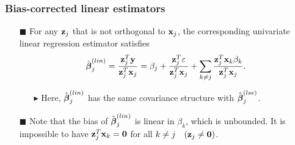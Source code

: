 \begin{frame}
\frametitle{Bias-corrected linear estimators}
\begin{itemize}

\item[$\blacksquare$] For any $\mbox{\bf z}_{j}$ that is not orthogonal to $\mbox{\bf x}_{j}$, the corresponding univariate linear regression estimator satisfies
\begin{equation*}
\hat{\mbox{\boldmath $\beta$}}^{(lin)}_{j}= \frac{\mbox{\bf z}^{T}_{j} \mbox{\bf y}}{\mbox{\bf z}^{T}_{j} \mbox{\bf x}_{j}}= \beta_j + \frac{\mbox{\bf z}_j^T \varepsilon}{\mbox{\bf z}_j^T\mbox{\bf x}_j}
+ \sum_{k\neq j}\frac{\mbox{\bf z}_j^T\mbox{\bf x}_k\beta_k}{\mbox{\bf z}_j^T\mbox{\bf x}_j}.
\end{equation*}
  \begin{itemize}
  \item[$\blacktriangleright$] Here,  $\hat{\mbox{\boldmath $\beta$}}^{(lin)}_{j}$ has the same covariance structure with $\hat{\mbox{\boldmath $\beta$}}^{(lse)}_{j}$.
  \end{itemize}
\item[$\blacksquare$] Note that the bias of $\hat{\mbox{\boldmath $\beta$}}^{(lin)}_{j}$ is linear in $\beta_k$, which is unbounded. It is impossible to have $\mbox{\bf z}_{j}^T \mbox{\bf x}_{k}=\mbox{\bf 0}$ for all $k\neq j \quad (\mbox{\bf z}_{j}\neq\mbox{\bf 0})$. 
\end{itemize}
\end{frame}

